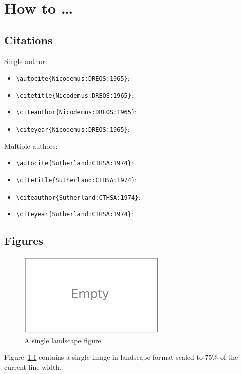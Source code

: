 
\chapter{How to \ldots}
\label{app:how-to}

\section{Citations}
\label{app:how-to:citations}

Single author:
\begin{itemize}
\item \verb!\autocite{Nicodemus:DREOS:1965}!: \autocite{Nicodemus:DREOS:1965}
\item \verb!\citetitle{Nicodemus:DREOS:1965}!: 
\item \verb!\citeauthor{Nicodemus:DREOS:1965}!: \citeauthor{Nicodemus:DREOS:1965}
\item \verb!\citeyear{Nicodemus:DREOS:1965}!: \citeyear{Nicodemus:DREOS:1965}
\end{itemize}
Multiple authors:
\begin{itemize}
\item \verb!\autocite{Sutherland:CTHSA:1974}!: \autocite{Sutherland:CTHSA:1974}
\item \verb!\citetitle{Sutherland:CTHSA:1974}!: 
\item \verb!\citeauthor{Sutherland:CTHSA:1974}!: \citeauthor{Sutherland:CTHSA:1974}
\item \verb!\citeyear{Sutherland:CTHSA:1974}!: \citeyear{Sutherland:CTHSA:1974}
\end{itemize}
\par

\section{Figures}
\label{app:how-to:figures}

\begin{figure}
  \centering
  \includegraphics[width=0.75\linewidth]{figures/empty_lscape}
  \caption[A single landscape figure]{A single landscape figure.}
  \label{fig:how-to:figures:lscape}
\end{figure}
Figure~\ref{fig:how-to:figures:lscape} contains a single image in landscape format scaled to 75\% of
the current line width.
\par

